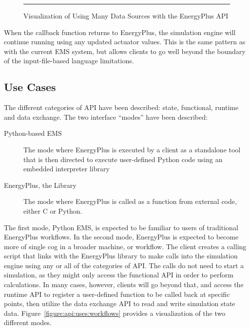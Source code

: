 \documentclass[5p, authoryear]{elsarticle}
\begin{document}
\begin{figure}
\begin{center}
\label{figure:api:purpose:callback_collection}
\rule{2cm}{2cm}
\caption{Visualization of Using Many Data Sources with the EnergyPlus API}
\end{center}
\end{figure}

When the callback function returns to EnergyPlus, the simulation engine will continue running using any updated actuator values.
This is the same pattern as with the current EMS system, but allows clients to go well beyond the boundary of the input-file-based language limitations.

\subsection{Use Cases}
The different categories of API have been described: state, functional, runtime and data exchange.
The two interface ``modes'' have been described:
\begin{description}
\item[Python-based EMS] The mode where EnergyPlus is executed by a client as a standalone tool that is then directed to execute user-defined Python code using an embedded interpreter library
\item[EnergyPlus, the Library] The mode where EnergyPlus is called as a function from external code, either C or Python.
\end{description}
The first mode, Python EMS, is expected to be familiar to users of traditional EnergyPlus workflows.
In the second mode, EnergyPlus is expected to become more of single cog in a broader machine, or workflow.
The client creates a calling script that links with the EnergyPlus library to make calls into the simulation engine using any or all of the categories of API.
The calls do not need to start a simulation, as they might only access the functional API in order to perform calculations.
In many cases, however, clients will go beyond that, and access the runtime API to register a user-defined function to be called back at specific points, then utilize the data exchange API to read and write simulation state data.
Figure~\ref{figure:api:uses:workflows} provides a visualization of the two different modes.
\end{document}
